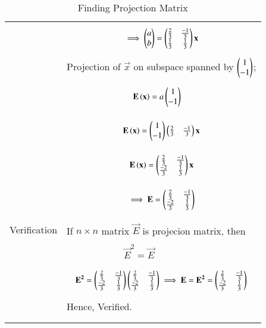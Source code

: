 \documentclass[journal,12pt]{IEEEtran}
\begin{document}
\begin{longtable}{|p{4cm}|p{14cm}|}
       
       
       &
       {\begin{align}
       \implies \begin{pmatrix}a\\b\end{pmatrix} = \begin{pmatrix}\frac{2}{3}&\frac{-1}{3}\\\frac{1}{3}&\frac{1}{3}\end{pmatrix}\mathbf{x}
       \end{align}}\\
       
     & Projection of $\vec{x}$ on subspace spanned by $\begin{pmatrix}1\\-1\end{pmatrix}$;\\
     
     
     &
     {\begin{align}
     & \mathbf{E}\left(\mathbf{x}\right) = a\begin{pmatrix}1\\-1\end{pmatrix}
     \end{align}}\\
     &
     {\begin{align}
       \mathbf{E}\left(\mathbf{x}\right) = \begin{pmatrix}1\\-1\end{pmatrix}\begin{pmatrix}\frac{2}{3}& \frac{-1}{3}\end{pmatrix}\mathbf{x}
       \end{align}}\\
       &{\begin{align}
     \mathbf{E}\left(\mathbf{x}\right) = \begin{pmatrix}\frac{2}{3}&\frac{-1}{3}\\\frac{-2}{3}&\frac{1}{3}\end{pmatrix}\mathbf{x}
      \end{align}}\\
      &{\begin{align}
      \implies{ \mathbf{E}= \ensuremath{\begin{pmatrix}\frac{2}{3}&\frac{-1}{3}\\\frac{-2}{3}& \frac{1}{3}\end{pmatrix}}}
      \end{align}}\\
       \hline
       \multirow{3}{*}{Verification} & \\
& If $n\times n$ matrix $\vec{E}$ is projecion matrix, then\\
	&\\
	&$\qquad\qquad\qquad \vec{E}^2=\vec{E}$\\
	&\\
  &{\begin{align}
  \mathbf{E^{2}} = \begin{pmatrix}\frac{2}{3}&\frac{-1}{3}\\\frac{-2}{3}& \frac{1}{3}\end{pmatrix}\begin{pmatrix}\frac{2}{3}&\frac{-1}{3}\\\frac{-2}{3}& \frac{1}{3}\end{pmatrix}
  \implies \mathbf{E}=\mathbf{E^{2}}=\begin{pmatrix}\frac{2}{3}&\frac{-1}{3}\\\frac{-2}{3}& \frac{1}{3}\end{pmatrix}
  \end{align}}\\
  & Hence, Verified.\\
  &\\
	\hline
\caption{Finding Projection Matrix}
\label{table:1}	
     \end{longtable}
     
\end{document}
